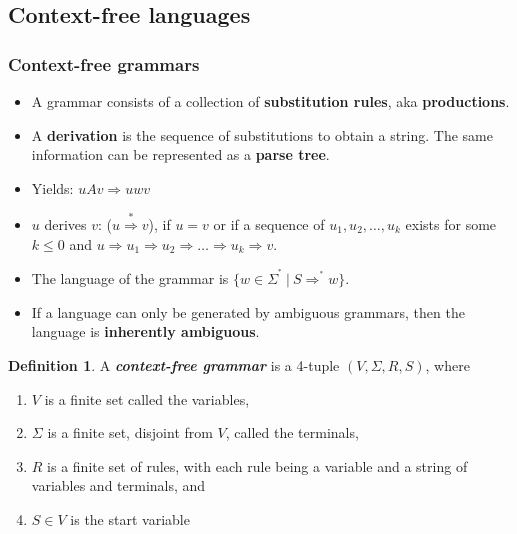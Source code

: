 \documentclass[11pt]{article}
\theoremstyle{definition}
\newtheorem{defn}{Definition}[section]
\begin{document}
\subsection{Context-free languages}
\subsubsection{Context-free grammars}
\begin{itemize}[leftmargin=*]
    \item A grammar consists of a collection of \textbf{substitution rules}, aka \textbf{productions}.
    \item A \textbf{derivation} is the sequence of substitutions to obtain a string. The same information can be represented as a \textbf{parse tree}.
    \item Yields: $uAv \Rightarrow uwv$
    \item $u$ derives $v$: ($u\overset{*}{\Rightarrow}v$), if $u=v$ or if a sequence of $u_1,u_2,\ldots,u_k$ exists for some $k\leq0$ and $u\Rightarrow u_1\Rightarrow u_2\Rightarrow\ldots\Rightarrow u_k\Rightarrow v$.
    \item The language of the grammar is $\{w \in \Sigma^{^{*}}\ |\ S \Rightarrow^{^{*}} w\}$.
    \item If a language can only be generated by ambiguous grammars, then the language is \textbf{inherently ambiguous}.
\end{itemize}
\begin{defn}
A \textbf{\textit{context-free grammar}} is a 4-tuple $(V,\Sigma,R,S)$, where
\begin{enumerate}
    \item $V$ is a finite set called the variables,
    \item $\Sigma$ is a finite set, disjoint from $V$, called the terminals,
    \item $R$ is a finite set of rules, with each rule being a variable and a string of variables and terminals, and
    \item $S\in V$ is the start variable
\end{enumerate}
\end{defn}
\end{document}

